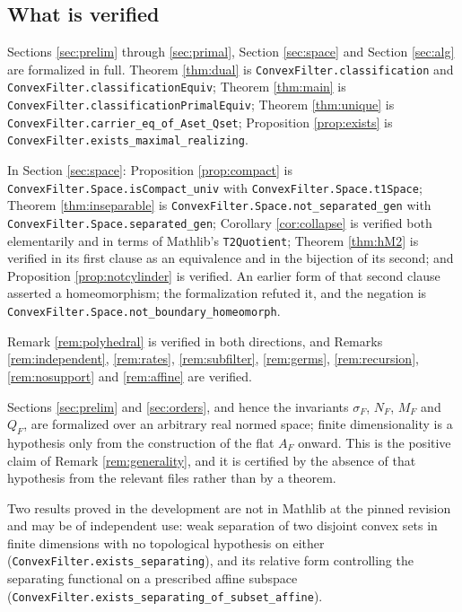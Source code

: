 \documentclass[11pt]{amsart}
\theoremstyle{plain}
\theoremstyle{definition}
\begin{document}
\subsection*{What is verified}
Sections \ref{sec:prelim} through \ref{sec:primal}, Section \ref{sec:space} and Section \ref{sec:alg} are formalized in full. Theorem \ref{thm:dual} is \texttt{ConvexFilter.\allowbreak classification} and \texttt{ConvexFilter.\allowbreak classificationEquiv}; Theorem \ref{thm:main} is \texttt{ConvexFilter.\allowbreak classificationPrimalEquiv}; Theorem \ref{thm:unique} is \texttt{ConvexFilter.\allowbreak carrier\_eq\_of\_Aset\_Qset}; Proposition \ref{prop:exists} is \texttt{ConvexFilter.\allowbreak exists\_maximal\_realizing}.

In Section \ref{sec:space}: Proposition \ref{prop:compact} is \texttt{ConvexFilter.\allowbreak Space.\allowbreak isCompact\_univ} with \texttt{ConvexFilter.\allowbreak Space.\allowbreak t1Space}; Theorem \ref{thm:inseparable} is \texttt{ConvexFilter.\allowbreak Space.\allowbreak not\_separated\_gen} with \texttt{ConvexFilter.\allowbreak Space.\allowbreak separated\_gen}; Corollary \ref{cor:collapse} is verified both elementarily and in terms of Mathlib's \texttt{T2Quotient}; Theorem \ref{thm:hM2} is verified in its first clause as an equivalence and in the bijection of its second; and Proposition \ref{prop:notcylinder} is verified. An earlier form of that second clause asserted a homeomorphism; the formalization refuted it, and the negation is \texttt{ConvexFilter.\allowbreak Space.\allowbreak not\_boundary\_homeomorph}.

Remark \ref{rem:polyhedral} is verified in both directions, and Remarks \ref{rem:independent}, \ref{rem:rates}, \ref{rem:subfilter}, \ref{rem:germs}, \ref{rem:recursion}, \ref{rem:nosupport} and \ref{rem:affine} are verified.

Sections \ref{sec:prelim} and \ref{sec:orders}, and hence the invariants $\sigma_F$, $N_F$, $M_F$ and $Q_F$, are formalized over an arbitrary real normed space; finite dimensionality is a hypothesis only from the construction of the flat $A_F$ onward. This is the positive claim of Remark \ref{rem:generality}, and it is certified by the absence of that hypothesis from the relevant files rather than by a theorem.

Two results proved in the development are not in Mathlib at the pinned revision and may be of independent use: weak separation of two disjoint convex sets in finite dimensions with no topological hypothesis on either (\texttt{ConvexFilter.\allowbreak exists\_separating}), and its relative form controlling the separating functional on a prescribed affine subspace (\texttt{ConvexFilter.\allowbreak exists\_separating\_of\_subset\_affine}).
\end{document}
